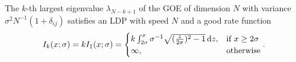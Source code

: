 \begin{theorem}
	The $k$-th largest eigenvalue $\lambda_{N-k+1}$ of the GOE of dimension $N$ with variance $\sigma^2 N^{-1}(1+\delta_{ij})$  satisfies an LDP with speed $N$ and a good rate function 
	\begin{equation}\label{thm:A.1}
		I_k(x;\sigma)=k I_1(x;\sigma)=\begin{cases}
						k\int_{2\sigma}^x \sigma^{-1}\sqrt{(\frac{z}{2\sigma})^2-1}\mathop{}\!\mathrm{d} z, &\mbox{if } x\geq 2\sigma \\
						\infty, &\mbox{otherwise}
					  \end{cases}.
	\end{equation}
\end{theorem}








